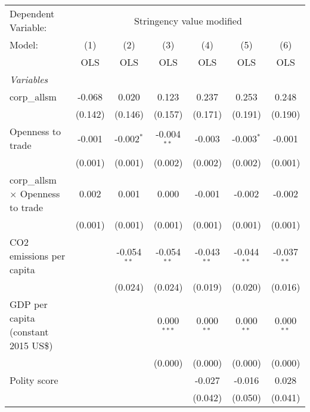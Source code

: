 
\begingroup
\centering
\begin{tabular}{lcccccc}
   \toprule
   Dependent Variable: & \multicolumn{6}{c}{Stringency value modified}\\
   Model:                                   & (1)     & (2)           & (3)           & (4)           & (5)           & (6)\\  
                                            &  OLS    & OLS           & OLS           & OLS           & OLS           & OLS\\  
   \midrule
   \emph{Variables}\\
   corp\_allsm                              & -0.068  & 0.020         & 0.123         & 0.237         & 0.253         & 0.248\\   
                                            & (0.142) & (0.146)       & (0.157)       & (0.171)       & (0.191)       & (0.190)\\   
   Openness to trade                        & -0.001  & -0.002$^{*}$  & -0.004$^{**}$ & -0.003        & -0.003$^{*}$  & -0.001\\   
                                            & (0.001) & (0.001)       & (0.002)       & (0.002)       & (0.002)       & (0.001)\\   
   corp\_allsm $\times$ Openness to trade   & 0.002   & 0.001         & 0.000         & -0.001        & -0.002        & -0.002\\   
                                            & (0.001) & (0.001)       & (0.001)       & (0.001)       & (0.001)       & (0.001)\\   
   CO2 emissions per capita                 &         & -0.054$^{**}$ & -0.054$^{**}$ & -0.043$^{**}$ & -0.044$^{**}$ & -0.037$^{**}$\\   
                                            &         & (0.024)       & (0.024)       & (0.019)       & (0.020)       & (0.016)\\   
   GDP per capita (constant 2015 US\$)      &         &               & 0.000$^{***}$ & 0.000$^{**}$  & 0.000$^{**}$  & 0.000$^{**}$\\   
                                            &         &               & (0.000)       & (0.000)       & (0.000)       & (0.000)\\   
   Polity score                             &         &               &               & -0.027        & -0.016        & 0.028\\   
                                            &         &               &               & (0.042)       & (0.050)       & (0.041)\\   

\end{tabular}
